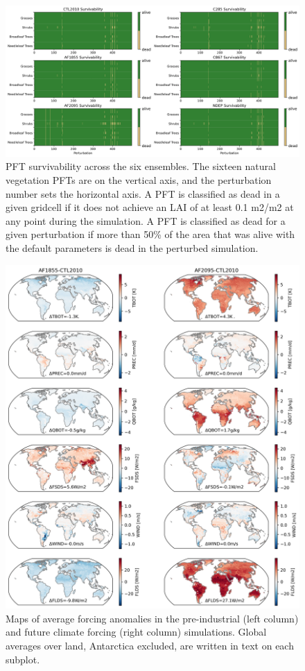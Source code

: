 \documentclass[11pt]{article}
\begin{document}
\begin{landscape}
\begin{figure}[h]
\centering
\includegraphics[width=50pc]{../figs/supp/survivability.png}
\caption{PFT survivability across the six ensembles. The sixteen natural vegetation PFTs are on the vertical axis, and the perturbation number sets the horizontal axis. A PFT is classified as dead in a given gridcell if it does not achieve an LAI of at least 0.1 m2/m2 at any point during the simulation. A PFT is classified as dead for a given perturbation if more than 50\% of the area that was alive with the default parameters is dead in the perturbed simulation.}
\label{supp:surv}
\end{figure}
\end{landscape}

\begin{figure}[h]
\centering
\includegraphics[width=\textwidth]{../figs/supp/anomalies.png}
\caption{Maps of average forcing anomalies in the pre-industrial (left column) and future climate forcing (right column) simulations. Global averages over land, Antarctica excluded, are written in text on each subplot.}
\label{supp:anomalies}
\end{figure}
\end{document}
